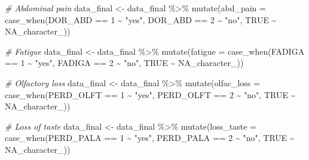\documentclass[
]{article}
\newenvironment{Shaded}{\begin{snugshade}}{\end{snugshade}}
\newcommand{\AttributeTok}[1]{\textcolor[rgb]{0.77,0.63,0.00}{#1}}
\newcommand{\CommentTok}[1]{\textcolor[rgb]{0.56,0.35,0.01}{\textit{#1}}}
\newcommand{\ConstantTok}[1]{\textcolor[rgb]{0.00,0.00,0.00}{#1}}
\newcommand{\DecValTok}[1]{\textcolor[rgb]{0.00,0.00,0.81}{#1}}
\newcommand{\FunctionTok}[1]{\textcolor[rgb]{0.00,0.00,0.00}{#1}}
\newcommand{\NormalTok}[1]{#1}
\newcommand{\OtherTok}[1]{\textcolor[rgb]{0.56,0.35,0.01}{#1}}
\newcommand{\SpecialCharTok}[1]{\textcolor[rgb]{0.00,0.00,0.00}{#1}}
\newcommand{\StringTok}[1]{\textcolor[rgb]{0.31,0.60,0.02}{#1}}
\begin{document}
\begin{Shaded}
\begin{Highlighting}[]
\CommentTok{\# Abdominal pain}
\NormalTok{data\_final }\OtherTok{\textless{}{-}}\NormalTok{  data\_final }\SpecialCharTok{\%\textgreater{}\%}
  \FunctionTok{mutate}\NormalTok{(}\AttributeTok{abd\_pain =} \FunctionTok{case\_when}\NormalTok{(DOR\_ABD }\SpecialCharTok{==} \DecValTok{1} \SpecialCharTok{\textasciitilde{}} \StringTok{"yes"}\NormalTok{,}
\NormalTok{                              DOR\_ABD }\SpecialCharTok{==} \DecValTok{2} \SpecialCharTok{\textasciitilde{}} \StringTok{"no"}\NormalTok{,}
                              \ConstantTok{TRUE} \SpecialCharTok{\textasciitilde{}} \ConstantTok{NA\_character\_}\NormalTok{))}

\CommentTok{\# Fatigue}
\NormalTok{data\_final }\OtherTok{\textless{}{-}}\NormalTok{  data\_final }\SpecialCharTok{\%\textgreater{}\%}
  \FunctionTok{mutate}\NormalTok{(}\AttributeTok{fatigue =} \FunctionTok{case\_when}\NormalTok{(FADIGA }\SpecialCharTok{==} \DecValTok{1} \SpecialCharTok{\textasciitilde{}} \StringTok{"yes"}\NormalTok{,}
\NormalTok{                             FADIGA }\SpecialCharTok{==} \DecValTok{2} \SpecialCharTok{\textasciitilde{}} \StringTok{"no"}\NormalTok{,}
                             \ConstantTok{TRUE} \SpecialCharTok{\textasciitilde{}} \ConstantTok{NA\_character\_}\NormalTok{))}

\CommentTok{\# Olfactory loss}
\NormalTok{data\_final }\OtherTok{\textless{}{-}}\NormalTok{  data\_final }\SpecialCharTok{\%\textgreater{}\%}
  \FunctionTok{mutate}\NormalTok{(}\AttributeTok{olfac\_loss =} \FunctionTok{case\_when}\NormalTok{(PERD\_OLFT }\SpecialCharTok{==} \DecValTok{1} \SpecialCharTok{\textasciitilde{}} \StringTok{"yes"}\NormalTok{,}
\NormalTok{                                PERD\_OLFT }\SpecialCharTok{==} \DecValTok{2} \SpecialCharTok{\textasciitilde{}} \StringTok{"no"}\NormalTok{,}
                                \ConstantTok{TRUE} \SpecialCharTok{\textasciitilde{}} \ConstantTok{NA\_character\_}\NormalTok{))}

\CommentTok{\# Loss of taste}
\NormalTok{data\_final }\OtherTok{\textless{}{-}}\NormalTok{  data\_final }\SpecialCharTok{\%\textgreater{}\%}
  \FunctionTok{mutate}\NormalTok{(}\AttributeTok{loss\_taste =} \FunctionTok{case\_when}\NormalTok{(PERD\_PALA }\SpecialCharTok{==} \DecValTok{1} \SpecialCharTok{\textasciitilde{}} \StringTok{"yes"}\NormalTok{,}
\NormalTok{                                PERD\_PALA }\SpecialCharTok{==} \DecValTok{2} \SpecialCharTok{\textasciitilde{}} \StringTok{"no"}\NormalTok{,}
                                \ConstantTok{TRUE} \SpecialCharTok{\textasciitilde{}} \ConstantTok{NA\_character\_}\NormalTok{))}


\end{Highlighting}
\end{Shaded}
\end{document}
